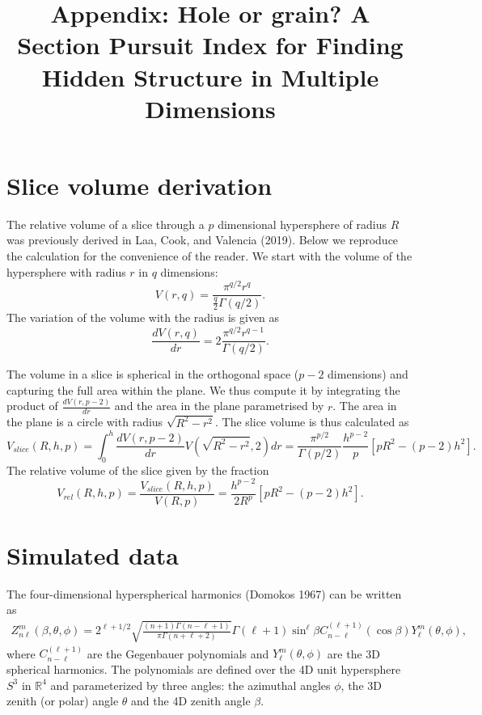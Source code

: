 \documentclass[
]{article}
\title{Appendix: Hole or grain? A Section Pursuit Index for Finding
Hidden Structure in Multiple Dimensions}
\author{}
\date{\vspace{-2.5em}}
\begin{document}
\maketitle

\hypertarget{slice-volume-derivation}{%
\section{Slice volume derivation}\label{slice-volume-derivation}}

The relative volume of a slice through a \(p\) dimensional hypersphere
of radius \(R\) was previously derived in Laa, Cook, and Valencia
(2019). Below we reproduce the calculation for the convenience of the
reader. We start with the volume of the hypersphere with radius \(r\) in
\(q\) dimensions: \begin{equation}
V(r, q) = \frac{\pi^{q/2} r^q}{\frac{q}{2} \Gamma(q/2)}.
\end{equation} The variation of the volume with the radius is given as
\begin{equation}
\frac{dV(r, q)}{dr} = 2 \frac{\pi^{q/2} r^{q-1}}{\Gamma(q/2)}.
\end{equation}

The volume in a slice is spherical in the orthogonal space (\(p-2\)
dimensions) and capturing the full area within the plane. We thus
compute it by integrating the product of \(\frac{dV(r, p-2)}{dr}\) and
the area in the plane parametrised by \(r\). The area in the plane is a
circle with radius \(\sqrt{R^2 - r^2}\). The slice volume is thus
calculated as \begin{equation}
V_{slice}(R, h, p) =
\int_0^h \frac{dV(r, p-2)}{dr} V(\sqrt{R^2 - r^2}, 2) dr =
\frac{\pi^{p/2}}{\Gamma(p/2)} \frac{h^{p-2}}{p} [pR^2 - (p-2)h^2].
\end{equation} The relative volume of the slice given by the fraction
\begin{equation}
V_{rel}(R, h, p) = \frac{V_{slice}(R, h, p)}{V(R, p)} = \frac{h^{p-2}}{2R^p} [pR^2 - (p-2)h^2].
\end{equation}

\hypertarget{simulated-data}{%
\section{Simulated data}\label{simulated-data}}

The four-dimensional hyperspherical harmonics (Domokos 1967) can be
written as \begin{eqnarray}
Z^m_{n\ell}(\beta,\theta,\phi)=2^{\ell+1/2}\sqrt{\frac{(n+1)\Gamma(n-\ell+1)}{\pi\Gamma(n+\ell+2)}}
\Gamma(\ell+1)\sin^\ell\beta C^{(\ell+1)}_{n-\ell}(\cos\beta)Y^m_\ell(\theta,\phi),
\end{eqnarray} where \(C^{(\ell+1)}_{n-\ell}\) are the Gegenbauer
polynomials and \(Y^m_\ell(\theta,\phi)\) are the 3D spherical
harmonics. The polynomials are defined over the 4D unit hypersphere
\(S^3\) in \(\mathbb{R}^4\) and parameterized by three angles: the
azimuthal angles \(\phi\), the 3D zenith (or polar) angle \(\theta\) and
the 4D zenith angle \(\beta\).
\end{document}
